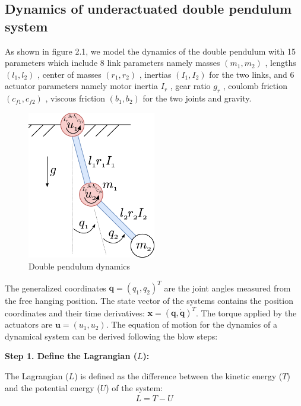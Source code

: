 \subsection{Dynamics of underactuated double pendulum system}
As shown in figure 2.1, we model the dynamics of the double pendulum with 15 parameters which include 8 link parameters namely masses \((m_1,m_2)\)
, lengths \((l_1,l_2)\)
, center of masses \((r_1,r_2)\) 
, inertias \((I_1,I_2)\)
 for the two links, and 6 actuator parameters namely motor inertia \(I_r\)
, gear ratio \(g_r\)
, coulomb friction \((c_{f1},c_{f2})\)
, viscous friction \((b_1,b_2)\)
 for the two joints and gravity.
\begin{figure}[h]
  \centering
  \includegraphics[width=0.5\textwidth]{figures/double_pendulum_dynamics.png} %
  \caption{Double pendulum dynamics}
  \label{fig:sample}
\end{figure}

The generalized coordinates \( \mathbf{q} =(q_1,q_2)^T \) are the joint angles measured from the free hanging position. The state vector of the systems contains the position coordinates and their time derivatives: \(\mathbf{x}=(\mathbf{q},\mathbf{\dot{q}})^T\). The torque applied by the actuators are \(\mathbf{u}=(u_1,u_2)\). The equation of motion for the dynamics of a dynamical system can be derived following the blow steps:

\textbf{Step 1. Define the Lagrangian (\(L\)):}

   The Lagrangian (\(L\)) is defined as the difference between the kinetic energy (\(T\)) and the potential energy (\(U\)) of the system:
   \begin{align}
         L = T - U
   \end{align}


